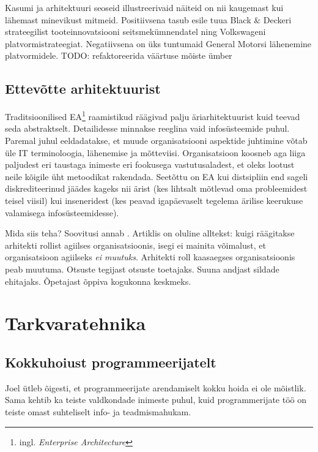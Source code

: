 \documentclass{article}
\begin{document}
Kasumi ja arhitektuuri seoseid illustreerivaid näiteid on nii kaugemast kui lähemast minevikust mitmeid. Positiivsena tasub esile tuua Black \& Deckeri strateegilist tooteinnovatsiooni seitsmekümnendatel ning Volkswageni platvormistrateegiat. Negatiivsena on üks tuntumaid General Motorsi lähenemine platvormidele. 
TODO: refaktoreerida väärtuse mõiste ümber


\subsection{Ettevõtte arhitektuurist}
Traditsioonilised EA\footnote{ingl. \emph{Enterprise Architecture}} raamistikud räägivad palju äriarhitektuurist kuid teevad seda abstraktselt. Detailidesse minnakse reeglina vaid infosüsteemide puhul. Paremal juhul eeldadatakse, et muude organisatsiooni aspektide juhtimine võtab üle IT terminoloogia, lähenemise ja mõtteviisi. Organisatsioon koosneb aga liiga paljudest eri taustaga inimeste eri fookusega vastutusaladest, et oleks lootust neile kõigile üht metoodikat rakendada.  Seetõttu on EA kui distsipliin end sageli diskrediteerinud jäädes kageks nii ärist (kes lihtsalt mõtlevad oma probleemidest teisel viisil) kui inseneridest (kes peavad igapäevaselt tegelema ärilise keerukuse valamisega infosüsteemidesse).

Mida siis teha? Soovitusi annab \cite{fowlerlean}. Artiklis on oluline alltekst: kuigi räägitakse arhitekti rollist agiilses organisatsioonis, isegi ei mainita võimalust, et organisatsioon agiilseks \emph{ei muutuks}. Arhitekti roll kaasaegses organisatsioonis peab muutuma. Otsuste tegijast otsuste toetajaks. Suuna andjast sildade ehitajaks. Õpetajast õppiva kogukonna keskmeks. 

\section{Tarkvaratehnika}
\subsection{Kokkuhoiust programmeerijatelt}
\label{sec:kokkuhoid}
Joel ütleb õigesti, et programmeerijate arendamiselt kokku hoida ei ole mõistlik. Sama kehtib ka teiste valdkondade inimeste puhul, kuid programmerijate töö on teiste omast suhteliselt info- ja teadmismahukam.
\end{document}
